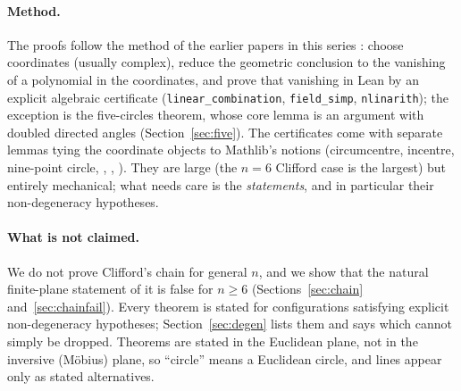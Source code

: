\documentclass[11pt]{article}
\theoremstyle{definition}
\theoremstyle{remark}
\newcommand{\lean}[1]{\texttt{#1}}
\begin{document}
\paragraph{Method.} The proofs follow the method of the earlier papers in this series
\cite{paperA,paperB}: choose coordinates (usually complex), reduce the geometric conclusion to the
vanishing of a polynomial in the coordinates, and prove that vanishing in Lean by an explicit
algebraic certificate (\lean{linear\_combination}, \lean{field\_simp}, \lean{nlinarith}); the exception
is the five-circles theorem, whose core lemma is an argument with doubled directed angles
(Section~\ref{sec:five}). The certificates come with
separate lemmas tying the coordinate objects to Mathlib's notions (circumcentre, incentre,
nine-point circle, , , ). They
are large (the $n=6$ Clifford case is the largest) but entirely mechanical; what needs care is the
\emph{statements}, and in particular their non-degeneracy hypotheses.

\paragraph{What is not claimed.} We do not prove Clifford's chain for general $n$, and we show that
the natural finite-plane statement of it is false for $n\ge6$ (Sections~\ref{sec:chain}
and~\ref{sec:chainfail}). Every theorem is stated for configurations satisfying explicit
non-degeneracy hypotheses; Section~\ref{sec:degen} lists them and says which cannot simply be dropped.
Theorems are stated in the Euclidean plane, not in the inversive (M\"obius) plane, so ``circle'' means
a Euclidean circle, and lines appear only as stated alternatives.
\end{document}
